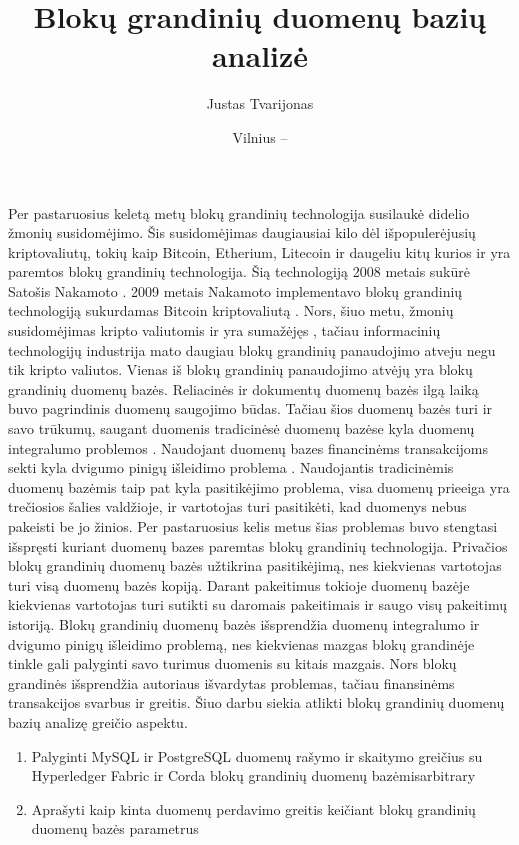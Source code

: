\documentclass{VUMIFPSkursinis}
\title{Blokų grandinių duomenų bazių analizė }
\author{Justas Tvarijonas}
\date{Vilnius – \the\year}
\begin{document}
\maketitle

\tableofcontents

Per pastaruosius keletą metų blokų grandinių technologija susilaukė didelio žmonių susidomėjimo. 
Šis susidomėjimas daugiausiai kilo dėl išpopulerėjusių kriptovaliutų, tokių kaip Bitcoin, Etherium, Litecoin ir daugeliu kitų 
kurios ir yra paremtos blokų grandinių technologija. Šią technologiją 2008 metais sukūrė Satošis Nakamoto  \cite{BlockChain}. 
2009 metais Nakamoto implementavo blokų grandinių technologiją sukurdamas Bitcoin kriptovaliutą \cite{Bitcoin}. 
Nors, šiuo metu, žmonių susidomėjimas kripto valiutomis ir yra sumažėjęs \cite{Trends}, tačiau informacinių technologijų industrija 
mato daugiau blokų grandinių panaudojimo atveju negu tik kripto valiutos. Vienas iš blokų grandinių panaudojimo atvėjų yra 
blokų grandinių duomenų bazės. Reliacinės ir dokumentų duomenų bazės ilgą laiką buvo pagrindinis duomenų saugojimo būdas. 
Tačiau šios duomenų bazės turi ir savo trūkumų, saugant duomenis tradicinėsė duomenų bazėse kyla duomenų integralumo problemos \cite{Integrity}
. 
Naudojant duomenų bazes financinėms transakcijoms sekti kyla dvigumo pinigų išleidimo problema\cite{Double}
. Naudojantis tradicinėmis duomenų bazėmis 
taip pat kyla pasitikėjimo problema, visa duomenų prieeiga yra trečiosios šalies valdžioje, ir vartotojas turi pasitikėti, kad duomenys nebus pakeisti be jo žinios.
Per pastaruosius kelis metus šias problemas
 buvo stengtasi išspręsti kuriant duomenų bazes paremtas blokų grandinių technologija. Privačios blokų grandinių duomenų bazės užtikrina pasitikėjimą, nes kiekvienas vartotojas turi visą duomenų 
bazės kopiją. Darant pakeitimus tokioje duomenų bazėje kiekvienas vartotojas turi sutikti su daromais pakeitimais ir saugo visų pakeitimų istoriją. Blokų grandinių duomenų bazės išsprendžia duomenų integralumo ir
dvigumo pinigų išleidimo problemą, nes kiekvienas mazgas blokų grandinėje tinkle gali palyginti savo turimus duomenis su kitais mazgais. 
Nors blokų grandinės išsprendžia autoriaus išvardytas problemas, tačiau finansinėms transakcijos svarbus ir greitis. Šiuo darbu siekia atlikti blokų grandinių duomenų bazių analizę greičio aspektu.

	\begin{enumerate}
		\item{Palyginti MySQL ir PostgreSQL duomenų rašymo ir skaitymo greičius su Hyperledger Fabric ir Corda blokų grandinių duomenų bazėmis}arbitrary
		\item{Aprašyti kaip kinta duomenų perdavimo greitis keičiant blokų grandinių duomenų bazės parametrus}
		
		
	\end{enumerate}
\pagebreak
\end{document}
